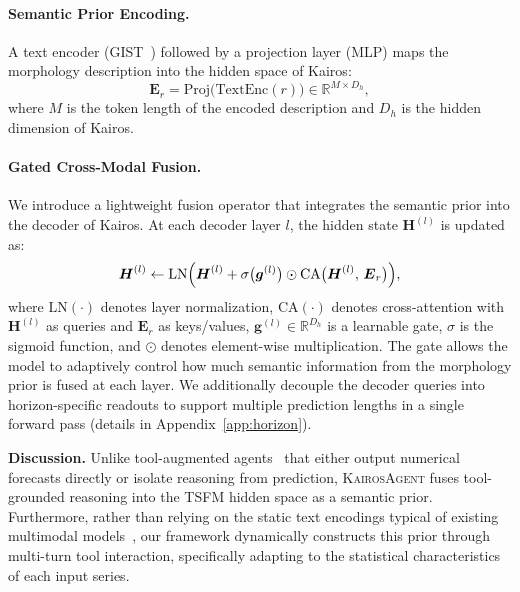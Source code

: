 \documentclass[11pt]{article}
\newcommand{\method}{\textsc{KairosAgent}\xspace}
\newcommand{\minisection}[1]{\vspace{5pt}\noindent\textbf{#1.}}
\begin{document}
\paragraph{Semantic Prior Encoding.}
A text encoder (GIST~\citep{solatorio2024gistembed}) followed by a projection layer (MLP) maps the morphology description into the hidden space of Kairos:
\begin{equation}
    \boldsymbol{E}_r
    = \mathrm{Proj}\bigl(\mathrm{TextEnc}(r)\bigr)
    \in \mathbb{R}^{M \times D_h},
\end{equation}
where $M$ is the token length of the encoded description and $D_h$ is the hidden dimension of Kairos.
\paragraph{Gated Cross-Modal Fusion.}
We introduce a lightweight fusion operator that integrates the semantic prior into the decoder of Kairos.
At each decoder layer $l$, the hidden state $\boldsymbol{H}^{(l)}$ is updated as:
\begin{equation}
    \boldsymbol{H}^{(l)}
    \leftarrow
    \mathrm{LN}\Bigl(
        \boldsymbol{H}^{(l)}
        + \sigma\bigl(\boldsymbol{g}^{(l)}\bigr)
          \odot
          \mathrm{CA}\bigl(\boldsymbol{H}^{(l)},\,\boldsymbol{E}_r\bigr)
    \Bigr),
\end{equation}
where $\mathrm{LN}(\cdot)$ denotes layer normalization, $\mathrm{CA}(\cdot)$ denotes cross-attention with $\boldsymbol{H}^{(l)}$ as queries and $\boldsymbol{E}_r$ as keys/values, $\boldsymbol{g}^{(l)}\in\mathbb{R}^{D_h}$ is a learnable gate, $\sigma$ is the sigmoid function, and $\odot$ denotes element-wise multiplication.
The gate allows the model to adaptively control how much semantic information from the morphology prior is fused at each layer.
We additionally decouple the decoder queries into horizon-specific readouts to support multiple prediction lengths in a single forward pass (details in Appendix~\ref{app:horizon}).

\minisection{Discussion}
Unlike tool-augmented agents~\citep{wu2026timeart, tao2026cast} that either output numerical forecasts directly or isolate reasoning from prediction, \method fuses tool-grounded reasoning into the TSFM hidden space as a semantic prior. Furthermore, rather than relying on the static text encodings typical of existing multimodal models~\citep{wu2025aurora, liu2025timecma, chowdhury2026t3time}, our framework dynamically constructs this prior through multi-turn tool interaction, specifically adapting to the statistical characteristics of each input series.
\end{document}
